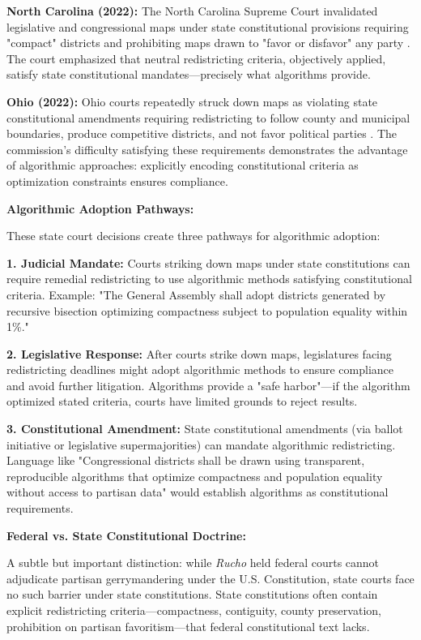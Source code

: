 \textbf{North Carolina (2022):} The North Carolina Supreme Court invalidated legislative and congressional maps under state constitutional provisions requiring "compact" districts and prohibiting maps drawn to "favor or disfavor" any party \citep{northcarolina2022}. The court emphasized that neutral redistricting criteria, objectively applied, satisfy state constitutional mandates—precisely what algorithms provide.

\textbf{Ohio (2022):} Ohio courts repeatedly struck down maps as violating state constitutional amendments requiring redistricting to follow county and municipal boundaries, produce competitive districts, and not favor political parties \citep{ohio2022}. The commission's difficulty satisfying these requirements demonstrates the advantage of algorithmic approaches: explicitly encoding constitutional criteria as optimization constraints ensures compliance.

\textbf{Algorithmic Adoption Pathways:}

These state court decisions create three pathways for algorithmic adoption:

\textbf{1. Judicial Mandate:} Courts striking down maps under state constitutions can require remedial redistricting to use algorithmic methods satisfying constitutional criteria. Example: "The General Assembly shall adopt districts generated by recursive bisection optimizing compactness subject to population equality within 1\%."

\textbf{2. Legislative Response:} After courts strike down maps, legislatures facing redistricting deadlines might adopt algorithmic methods to ensure compliance and avoid further litigation. Algorithms provide a "safe harbor"—if the algorithm optimized stated criteria, courts have limited grounds to reject results.

\textbf{3. Constitutional Amendment:} State constitutional amendments (via ballot initiative or legislative supermajorities) can mandate algorithmic redistricting. Language like "Congressional districts shall be drawn using transparent, reproducible algorithms that optimize compactness and population equality without access to partisan data" would establish algorithms as constitutional requirements.

\textbf{Federal vs. State Constitutional Doctrine:}

A subtle but important distinction: while \textit{Rucho} held federal courts cannot adjudicate partisan gerrymandering under the U.S. Constitution, state courts face no such barrier under state constitutions. State constitutions often contain explicit redistricting criteria—compactness, contiguity, county preservation, prohibition on partisan favoritism—that federal constitutional text lacks.

